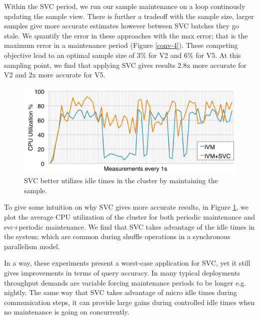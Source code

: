 Within the SVC period, we run our sample maintenance on a loop continously updating the sample view.
There is further a tradeoff with the sample size, larger samples give more accurate estimates however between SVC batches they go stale.
We quantify the error in these approaches with the max error; that is the maximum error in a maintenance period (Figure \ref{conv-4}).
These competing objective lead to an optimal sample size of 3\% for V2 and 6\% for V5. 
At this sampling point, we find that applying SVC gives results 2.8x more accurate for V2 and 2x more accurate for V5.

\begin{figure}[t]
\centering
\includegraphics[scale=0.14]{exp/con_7.pdf}
 \caption{SVC better utilizes idle times in the cluster by maintaining the sample.\label{conv-5}} 
\end{figure}
To give some intuition on why SVC gives more accurate results, in Figure \ref{conv-5}, we plot the average CPU utilization of the cluster for both periodic maintenance and svc+periodic maintenance. 
We find that SVC takes advantage of the idle times in the system; which are common during shuffle operations in a synchronous parallelism model.

In a way, these experiments present a worst-case application for SVC, yet it still gives improvements in terms of query accuracy.
In many typical deployments throughput demands are variable forcing maintenance periods to be longer e.g. nightly.
The same way that SVC takes advantage of micro idle times during communication steps, it can provide large gains during controlled idle times when no maintenance is going on concurrently.


